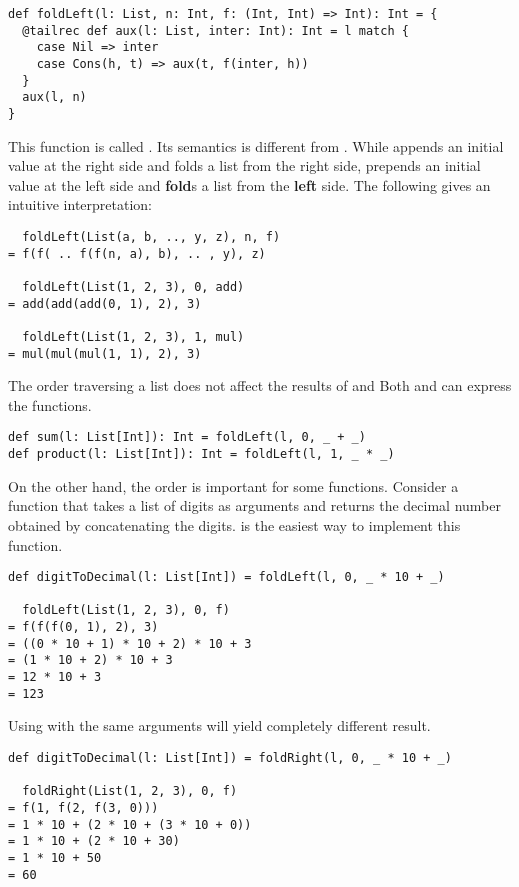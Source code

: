 \begin{verbatim}
def foldLeft(l: List, n: Int, f: (Int, Int) => Int): Int = {
  @tailrec def aux(l: List, inter: Int): Int = l match {
    case Nil => inter
    case Cons(h, t) => aux(t, f(inter, h))
  }
  aux(l, n)
}
\end{verbatim}

This function is called . Its semantics is different from
. While  appends an initial value at
the right side and folds a list from the right side, 
prepends an initial value at the left side and \textbf{fold}s
a list from the \textbf{left} side. The following gives an intuitive
interpretation:

\begin{verbatim}
  foldLeft(List(a, b, .., y, z), n, f)
= f(f( .. f(f(n, a), b), .. , y), z)

  foldLeft(List(1, 2, 3), 0, add)
= add(add(add(0, 1), 2), 3)

  foldLeft(List(1, 2, 3), 1, mul)
= mul(mul(mul(1, 1), 2), 3)
\end{verbatim}

The order traversing a list does not affect the results of  and
 Both  and  can express the functions.

\begin{verbatim}
def sum(l: List[Int]): Int = foldLeft(l, 0, _ + _)
def product(l: List[Int]): Int = foldLeft(l, 1, _ * _)
\end{verbatim}

On the other hand, the order is important for some functions.
Consider a function that takes a list of digits as arguments and returns the
decimal number obtained by concatenating the digits.
 is the easiest way to implement this function.

\begin{verbatim}
def digitToDecimal(l: List[Int]) = foldLeft(l, 0, _ * 10 + _)

  foldLeft(List(1, 2, 3), 0, f)
= f(f(f(0, 1), 2), 3)
= ((0 * 10 + 1) * 10 + 2) * 10 + 3
= (1 * 10 + 2) * 10 + 3
= 12 * 10 + 3
= 123
\end{verbatim}

Using  with the same arguments will yield completely different
result.

\begin{verbatim}
def digitToDecimal(l: List[Int]) = foldRight(l, 0, _ * 10 + _)

  foldRight(List(1, 2, 3), 0, f)
= f(1, f(2, f(3, 0)))
= 1 * 10 + (2 * 10 + (3 * 10 + 0))
= 1 * 10 + (2 * 10 + 30)
= 1 * 10 + 50
= 60
\end{verbatim}


